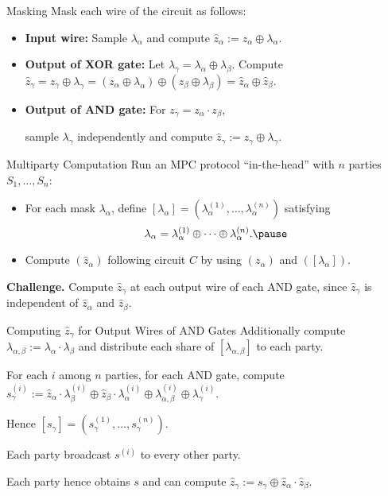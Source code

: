 \documentclass{beamer}
\begin{document}
	\begin{frame}{Masking}
		Mask each wire of the circuit as follows:\pause
		\begin{itemize}
			\item \textbf{Input wire:} Sample $\lambda_\alpha$ and compute $\hat{z}_\alpha := z_\alpha \oplus \lambda_\alpha$.\pause
			\item \textbf{Output of XOR gate:} Let $\lambda_\gamma = \lambda_\alpha \oplus \lambda_\beta$. Compute $\hat{z}_\gamma = z_\gamma \oplus \lambda_\gamma = (z_\alpha \oplus \lambda_\alpha) \oplus (z_\beta \oplus \lambda_\beta) =\hat{z}_\alpha \oplus \hat{z}_\beta$.\pause
			\item \textbf{Output of AND gate:} For $z_\gamma = z_\alpha \cdot z_\beta$, 
			
			sample $\lambda_\gamma$ independently and compute $\hat{z}_\gamma := z_\gamma \oplus \lambda_\gamma$.
		\end{itemize}
	\end{frame}

	\begin{frame}{Multiparty Computation}
		Run an MPC protocol ``in-the-head'' with $n$ parties $S_1, \dots, S_n$:\pause
		\begin{itemize}
			\item For each mask $\lambda_\alpha$, define $[\lambda_\alpha] = (\lambda_\alpha^{(1)}, \dots, \lambda_\alpha^{(n)})$ satisfying \pause
			\begin{equation*}
				\lambda_\alpha = \lambda_\alpha^{(1)} \oplus \dots\oplus \lambda_\alpha^{(n)}.\pause
			\end{equation*}
			\item Compute $\left(\hat{z}_\alpha\right)$ following circuit $C$ by using $\left(z_\alpha\right)$ and $\left([\lambda_\alpha]\right)$.\pause
		\end{itemize}
		\textbf{Challenge.} Compute $\hat{z}_\gamma$ at each output wire of each AND gate, since $\hat{z}_\gamma$ is independent of $\hat{z}_\alpha$ and $\hat{z}_\beta$.
	\end{frame}

	\begin{frame}{Computing $\hat{z}_\gamma$ for Output Wires of AND Gates}
		Additionally compute $\lambda_{\alpha,\beta} := \lambda_\alpha \cdot \lambda_\beta$ and distribute each share of $[\lambda_{\alpha,\beta}]$ to each party.\pause
		
		For each $i$ among $n$ parties, for each AND gate, compute $s^{(i)}_\gamma := \hat{z}_\alpha \cdot\lambda_\beta^{(i)}  \oplus \hat{z}_\beta\cdot\lambda_\alpha^{(i)}  \oplus \lambda_{\alpha,\beta}^{(i)}  \oplus \lambda_\gamma^{(i)} $.\pause
		
		Hence $[s_\gamma] = (s^{(1)}_\gamma, \dots, s^{(n)}_\gamma)$. \pause
		
		Each party broadcast $s^{(i)}$ to every other party. \pause
		
		Each party hence obtains $s$ and can compute $\hat{z}_\gamma := s_\gamma \oplus \hat{z}_\alpha \cdot \hat{z}_\beta$.
	\end{frame}
\end{document}
